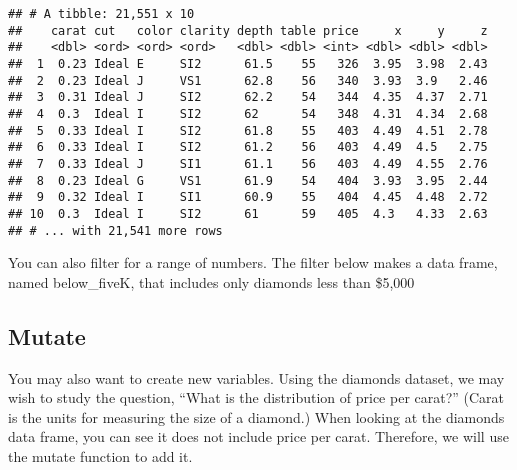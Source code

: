 \documentclass[]{article}
\newenvironment{Shaded}{\begin{snugshade}}{\end{snugshade}}
\newcommand{\KeywordTok}[1]{\textcolor[rgb]{0.13,0.29,0.53}{\textbf{#1}}}
\newcommand{\DataTypeTok}[1]{\textcolor[rgb]{0.13,0.29,0.53}{#1}}
\newcommand{\StringTok}[1]{\textcolor[rgb]{0.31,0.60,0.02}{#1}}
\newcommand{\OperatorTok}[1]{\textcolor[rgb]{0.81,0.36,0.00}{\textbf{#1}}}
\newcommand{\NormalTok}[1]{#1}
\begin{document}
\begin{verbatim}
## # A tibble: 21,551 x 10
##    carat cut   color clarity depth table price     x     y     z
##    <dbl> <ord> <ord> <ord>   <dbl> <dbl> <int> <dbl> <dbl> <dbl>
##  1  0.23 Ideal E     SI2      61.5    55   326  3.95  3.98  2.43
##  2  0.23 Ideal J     VS1      62.8    56   340  3.93  3.9   2.46
##  3  0.31 Ideal J     SI2      62.2    54   344  4.35  4.37  2.71
##  4  0.3  Ideal I     SI2      62      54   348  4.31  4.34  2.68
##  5  0.33 Ideal I     SI2      61.8    55   403  4.49  4.51  2.78
##  6  0.33 Ideal I     SI2      61.2    56   403  4.49  4.5   2.75
##  7  0.33 Ideal J     SI1      61.1    56   403  4.49  4.55  2.76
##  8  0.23 Ideal G     VS1      61.9    54   404  3.93  3.95  2.44
##  9  0.32 Ideal I     SI1      60.9    55   404  4.45  4.48  2.72
## 10  0.3  Ideal I     SI2      61      59   405  4.3   4.33  2.63
## # ... with 21,541 more rows
\end{verbatim}

You can also filter for a range of numbers. The filter below makes a
data frame, named below\_fiveK, that includes only diamonds less than
\$5,000

\subsection{Mutate}\label{mutate}

You may also want to create new variables. Using the diamonds dataset,
we may wish to study the question, ``What is the distribution of price
per carat?'' (Carat is the units for measuring the size of a diamond.)
When looking at the diamonds data frame, you can see it does not include
price per carat. Therefore, we will use the mutate function to add it.

\begin{Shaded}
\end{Shaded}
\end{document}
